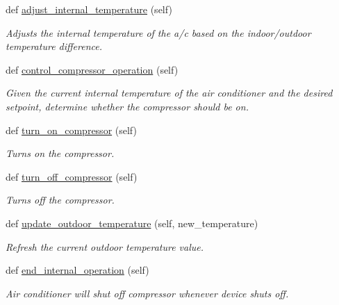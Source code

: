 \begin{DoxyCompactItemize}
def \hyperlink{class_build_1_1_objects_1_1air__conditioner_1_1_air_conditioner_simple_a641bfc9644a25a253f17c0e508ffa1ae}{adjust\+\_\+internal\+\_\+temperature} (self)
\begin{DoxyCompactList}\small\item\em Adjusts the internal temperature of the a/c based on the indoor/outdoor temperature difference. \end{DoxyCompactList}\item 
def \hyperlink{class_build_1_1_objects_1_1air__conditioner_1_1_air_conditioner_simple_a16c1867273e35cce644563ed0a33fcc9}{control\+\_\+compressor\+\_\+operation} (self)
\begin{DoxyCompactList}\small\item\em Given the current internal temperature of the air conditioner and the desired setpoint, determine whether the compressor should be on. \end{DoxyCompactList}\item 
def \hyperlink{class_build_1_1_objects_1_1air__conditioner_1_1_air_conditioner_simple_aa758ea8ab27c611b7e661f3eea7df4e6}{turn\+\_\+on\+\_\+compressor} (self)
\begin{DoxyCompactList}\small\item\em Turns on the compressor. \end{DoxyCompactList}\item 
def \hyperlink{class_build_1_1_objects_1_1air__conditioner_1_1_air_conditioner_simple_affced4fc3f6e8260d31c1690a8b5614d}{turn\+\_\+off\+\_\+compressor} (self)
\begin{DoxyCompactList}\small\item\em Turns off the compressor. \end{DoxyCompactList}\item 
def \hyperlink{class_build_1_1_objects_1_1air__conditioner_1_1_air_conditioner_simple_aafc4201ae9e6e9f297df07fc03f89be2}{update\+\_\+outdoor\+\_\+temperature} (self, new\+\_\+temperature)
\begin{DoxyCompactList}\small\item\em Refresh the current outdoor temperature value. \end{DoxyCompactList}\item 
def \hyperlink{class_build_1_1_objects_1_1air__conditioner_1_1_air_conditioner_simple_aa9fa855099f3b2d1db0726cc639c5026}{end\+\_\+internal\+\_\+operation} (self)
\begin{DoxyCompactList}\small\item\em Air conditioner will shut off compressor whenever device shuts off. \end{DoxyCompactList}\item 

\end{DoxyCompactItemize}
